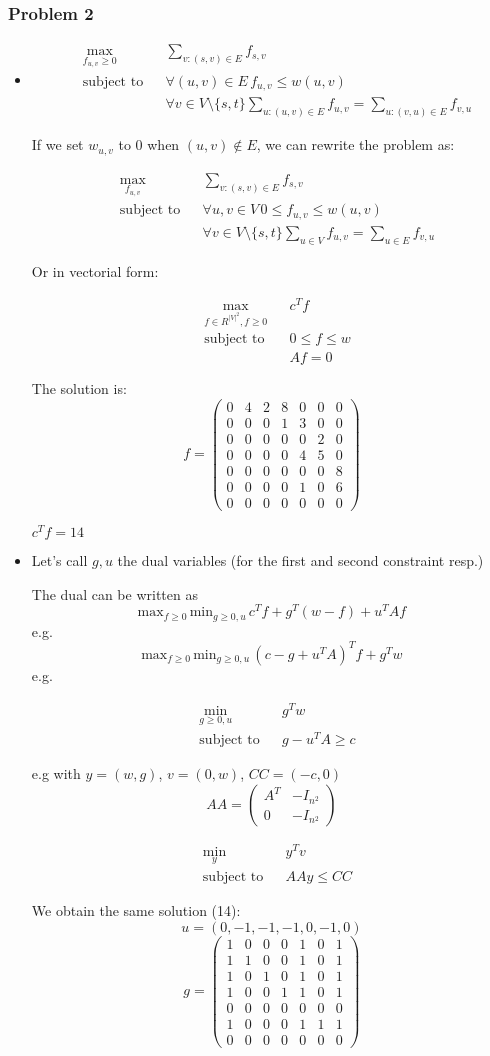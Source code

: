 \documentclass[12pt]{article}
\newcommand{\Q}[1]{\subsubsection*{Problem #1}}
\newcommand{\optimize}[4]
{
\begin{align*}
& \underset{#1}{\text{#4}}
& & #2 \\
& \text{subject to}
& & #3
\end{align*}
}
\newcommand{\minimize}[3]{\optimize{#1}{#2}{#3}{min}}
\newcommand{\maximize}[3]{\optimize{#1}{#2}{#3}{max}}
\begin{document}
\Q{2}
\begin{itemize}

\item
\maximize{f_{u,v} \geq 0}{ \sum_{v: (s,v) \in E} f_{s,v}}
{  \forall (u,v) \in E \, f_{u,v} \leq w(u, v) \\ &&& \forall v \in V \setminus \{s,t\} \sum_{u: (u,v) \in E} f_{u,v} = \sum_{u: (v, u) \in E} f_{v,u}}

If we set $w_{u,v}$ to 0 when $(u,v) \not \in E$, we can rewrite the problem as:
\maximize{f_{u,v} }{ \sum_{v: (s,v) \in E} f_{s,v}}
{  \forall u,v \in V \, 0 \leq f_{u,v} \leq w(u, v) \\ &&& \forall v \in V \setminus \{s,t\} \sum_{u \in V} f_{u,v} = \sum_{u \in E} f_{v,u}}


Or in vectorial form:

\maximize{f \in R^{|V|^2}, f \geq 0 }{ c^T f}
{  0 \leq f \leq w \\ &&& Af = 0}



The solution is: 
\[ f = 
\left(
\begin{array}{ccccccc}
  0&4&2&8&0&0&0\\
  0&0&0&1&3&0&0\\
  0&0&0&0&0&2&0\\
  0&0&0&0&4&5&0\\
  0&0&0&0&0&0&8\\
  0&0&0&0&1&0&6\\
  0&0&0&0&0&0&0
\end{array}
\right)
\]

$c^T f = 14$

\item Let's call $g, u$ the dual variables (for the first and second constraint resp.)

The dual can be written as
$$\text{max}_{f \geq 0 } \, { \text{min}_{g \geq 0, u} \, c^T f + g^T(w-f) + u^TAf}$$
e.g.
$$\text{max}_{f \geq 0 } \, { \text{min}_{g \geq 0, u} \, (c-g+u^TA)^T f + g^Tw }$$
e.g.
\minimize{g \geq 0, u}{g^Tw }{g - u^TA \geq c}



e.g with $y = (w, g)$, $v = (0 , w)$, $CC = (-c, 0)$\[ AA = \left(
  \begin{array}{cc} A^T&-I_{n^2}\\0&-I_{n^2}\end{array} 
\right)
\]

\minimize{y}{y^Tv }{AA y \leq CC}

We obtain the same solution (14):
$$u = (0, -1, -1, -1, 0, -1, 0)$$
\[ g = \left(
\begin{array}{ccccccc}
1&0&0&0&1&0&1\\
1&1&0&0&1&0&1\\
1&0&1&0&1&0&1\\
1&0&0&1&1&0&1\\
0&0&0&0&0&0&0\\
1&0&0&0&1&1&1\\
0&0&0&0&0&0&0
\end{array} \right)
\]



\end{itemize}
\end{document}
